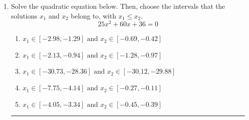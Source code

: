 \documentclass[14pt]{extbook}
\newcommand{\litem}[1]{\item#1\hspace*{-1cm}\rule{\textwidth}{0.4pt}}
\begin{document}
\begin{enumerate}
{\begin{enumerate}[label=\Alph*.]
\end{enumerate} }
\litem{
Solve the quadratic equation below. Then, choose the intervals that the solutions $x_1$ and $x_2$ belong to, with $x_1 \leq x_2$.\[ 25x^{2} +60 x + 36 = 0 \]\begin{enumerate}[label=\Alph*.]
\item \( x_1 \in [-2.98, -1.29] \text{ and } x_2 \in [-0.69, -0.42] \)
\item \( x_1 \in [-2.13, -0.94] \text{ and } x_2 \in [-1.28, -0.97] \)
\item \( x_1 \in [-30.73, -28.36] \text{ and } x_2 \in [-30.12, -29.88] \)
\item \( x_1 \in [-7.75, -4.14] \text{ and } x_2 \in [-0.27, -0.11] \)
\item \( x_1 \in [-4.05, -3.34] \text{ and } x_2 \in [-0.45, -0.39] \)

\end{enumerate} }
\end{enumerate}
\end{document}
